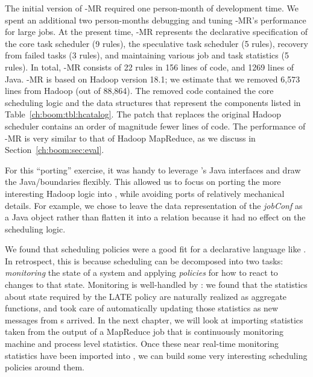 The initial version of \BOOM-MR required one person-month of
development time. We spent an additional two person-months debugging
and tuning \BOOM-MR's performance for large jobs. At the present time,
\BOOM-MR represents the declarative specification of the core task scheduler (9 rules),
the speculative task scheduler (5 rules), recovery from failed tasks (3 rules), and maintaining various
job and task statistics (5 rules). In total, \BOOM-MR consists of 22 \OVERLOG rules in 156 lines of
code, and 1269 lines of Java. \BOOM-MR is based on Hadoop version 18.1; we estimate
that we removed 6,573 lines from Hadoop (out of 88,864). The removed code contained
the core scheduling logic and the data structures that represent the
components listed in Table~\ref{ch:boom:tbl:hcatalog}. The \OVERLOG patch that
replaces the original Hadoop scheduler contains an order of magnitude
fewer lines of code.  The performance of \BOOM-MR is very similar to
that of Hadoop MapReduce, as we discuss in Section~\ref{ch:boom:sec:eval}.

For this ``porting'' exercise, it was handy to leverage \JOL's Java interfaces
and draw the Java/\OVERLOG boundaries flexibly.  This allowed us to focus on
porting the more interesting Hadoop logic into \OVERLOG, while avoiding ports of
relatively mechanical details.  For example, we chose to leave the data
representation of the \emph{jobConf} as a Java object rather than flatten it
into a relation because it had no effect on the scheduling logic.

We found that scheduling policies were a good fit for a declarative language
like \OVERLOG. In retrospect, this is because scheduling can be decomposed into
two tasks: \emph{monitoring} the state of a system and applying \emph{policies}
for how to react to changes to that state. Monitoring is well-handled by \OVERLOG: 
we found that the statistics about {\TT} state required by the LATE policy are naturally 
realized as aggregate functions, and \JOL took care of automatically updating those statistics 
as new messages from {\TT}s arrived. In the next chapter, we will look at importing statistics
taken from the output of a MapReduce job that is continuously monitoring machine and process level statistics.
Once these near real-time monitoring statistics have been imported into \JOL, we can build some 
very interesting scheduling policies around them.

